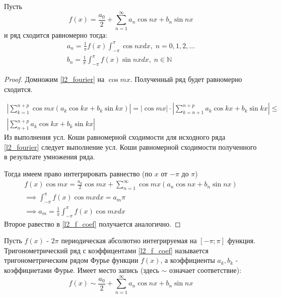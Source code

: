 \documentclass{article}
\begin{document}
\begin{lemma} \label{l2_f_lemma}
  Пусть
  \begin{equation} \label{l2_fourier}
    f(x)=\frac{a_0}{2}+\sum_{n=1}^{\infty}a_n\cos nx+b_n\sin nx
  \end{equation}
  и ряд сходится равномерно тогда:
  \begin{equation}
    \begin{gathered} \label{l2_f_coef}
      a_n=\frac{1}{\pi}f(x)\int_{-\pi}^{\pi}\cos nx dx, \; n=0,1,2,\dots \\ 
      b_n=\frac{1}{\pi}\int_{-\pi}^{\pi}f(x)\sin nx dx, \; n\in\mathbb{N} 
    \end{gathered}
  \end{equation}
\end{lemma}
\begin{proof}
  Домножим \ref{l2_fourier} на $\cos mx$. 
  Полученный ряд будет равномерно сходится.

  \hr
  \begin{gather*}
    \left|\sum_{k=1}^{n+p}\cos mx(a_k\cos kx + b_k \sin kx)\right|= 
    |\cos mx|\cdot\left|\sum_{k=n+1}^{n+p}a_k\cos kx + b_k\sin kx\right| \le  \\
    \left|\sum_{n+1}^{n+p}a_k\cos kx + b_k \sin kx\right|
  \end{gather*}
  Из выполнения усл. Коши равномерной сходимости для исходного ряда \ref{l2_fourier}
  следует выполнение усл. Коши равномерной сходимости полученного в результате умножения ряда.

  \hr
  Тогда имеем право интегрировать равнество (по $x$ от $-\pi$ до $\pi$)
  \begin{gather*}
    f(x)\cos mx = \frac{a_0}{2}\cos mx + \sum_{n=1}^{\infty}\cos mx (a_n \cos nx + b_n \sin nx) \\
    \implies \int_{-\pi}^{\pi}f(x)\cos mx dx = a_m \pi \\ 
    \implies a_m=\frac{1}{\pi}\int_{-\pi}^{\pi}f(x)\cos mx dx
  \end{gather*}
  Второе равество в \ref{l2_f_coef} получается аналогично.
\end{proof}
\begin{definition}
  Пусть $f(x)$ - $2\pi$ периодическая абсолютно интегрируемая на $[-\pi;\pi]$ функция.
  Тригонометрический ряд с коэффицентами \ref{l2_f_coef} называется
  тригонометрическим рядом Фурье функции $f(x)$, а коэффициенты $a_k,b_k$ - коэффициетами Фурье.
  Имеет место запись (здесь $\sim$ означает соответствие):
  \[
    f(x)\sim \frac{a_0}{2}+\sum_{n=1}^{\infty}a_n\cos nx + b_n\sin nx
  \]
\end{definition}
\end{document}
